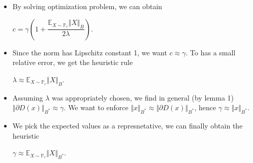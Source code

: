 \documentclass[landscape,headrule,footrule]{foils}
\begin{document}
\begin{frame}
\begin{flushleft}
\begin{itemize}
\item By solving optimization problem, we can obtain \\
\begin{center}
$c = \gamma \left(1+\dfrac{\mathbb{E}_{X \sim \mathbb{P}_r} \Vert X \Vert_B}{2 \lambda} \right)$. \\
\end{center}
\item Since the norm has Lipschitz constant 1, we want $c\approx \gamma$. To has a small relative error, we get the heuristic rule
\begin{center}
$ \lambda \approx \mathbb{E}_{X \sim \mathbb{P}_r} \Vert X \Vert_B$. \\
\end{center}
\item 
Assuming $\lambda$ was appropriately chosen, we find in general (by lemma 1) $\Vert \partial D(x) \Vert_{B^*} \approx \gamma$. We want to enforce $\Vert x \Vert_{B^*} \approx \Vert \partial D(x) \Vert_{B^*}$, hence $\gamma \approx \Vert x \Vert_{B^*}$. \\
\item We pick the expected values as a represnetative, we can finally obtain the heuristic
\begin{center}
$\gamma \approx \mathbb{E}_{X \sim \mathbb{P}_r} \Vert X \Vert_{B^*}$.
\end{center}

\end{itemize}
\end{flushleft}
\end{frame}

\end{document}
